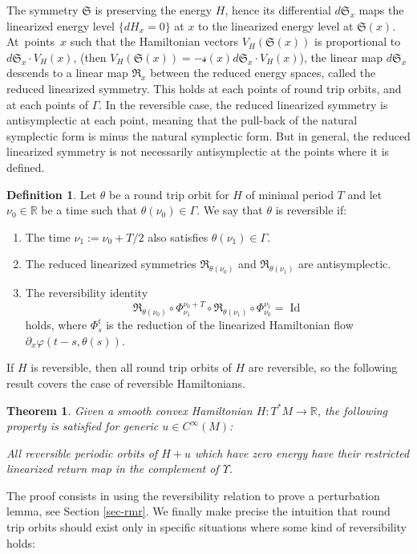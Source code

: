 \documentclass[10pt]{amsart}
\DeclareMathOperator{\Id}{Id}
\newcommand{\Rm}{\mathbb{R}}
\newcommand{\gR}{\ensuremath{\mathfrak{R}}}
\newcommand{\gS}{\ensuremath{\mathfrak{S}}}
\newcommand{\ms}{\ensuremath{\mathscr{s}}}
\theoremstyle{plain}
\newtheorem{thm}{Theorem}
\theoremstyle{definition}
\newtheorem{defn}[lem]{Definition}
\begin{document}
The symmetry $\gS$ is preserving the energy $H$, hence its differential $d\gS_x$ maps the linearized energy level $\{dH_x=0\}$ at $x$ to the linearized energy level at $\gS(x)$.
At~points~$x$ such that the Hamiltonian vectors $V_H(\gS(x))$ is proportional to \hbox{$d\gS_x \!\cdot\! V_H(x)$},
(then $
V_H(\gS(x))=-\ms(x) d\gS_x\cdot V_H(x)$),
the linear map $d\gS_x$ descends to a linear map $\gR_x$ between the reduced energy spaces,
called the reduced linearized symmetry.
This holds at each points of round trip orbits, and at each points of $\Gamma$.
In the reversible case, the reduced linearized symmetry is antisymplectic at each point,
meaning that the pull-back of the natural symplectic form is minus the natural symplectic form.
But in general, the reduced linearized symmetry is not necessarily antisymplectic at the points where it is defined.

\begin{defn}
Let $\theta$ be a round trip orbit for $H$ of minimal period $T$ and let $\nu_0\in \Rm$ be a time such that $\theta(\nu_0) \in \Gamma$. We say that $\theta$ is reversible if:
\begin{enumerate}
\item
The time $\nu_1:=\nu_0+T/2$ also satisfies $\theta(\nu_1)\in \Gamma$.
\item The reduced linearized symmetries $\gR_{\theta(\nu_0)}$ and $\gR_{\theta(\nu_1)}$ are antisymplectic.
\item The reversibility identity
\[
\gR_{\theta(\nu_0)}\circ \Phi^{\nu_0+T}_{\nu_1}\circ \gR_{\theta(\nu_1)}\circ\Phi_{\nu_0}^{\nu_1}=\Id
\]
holds, where $\Phi^t_s$ is the reduction of the linearized Hamiltonian flow
$\partial_x \varphi(t-s,\theta(s))$.
\end{enumerate}
\end{defn}

If $H$ is reversible, then all round trip orbits of $H$ are reversible, so the following result covers the case of reversible Hamiltonians.

\begin{thm}\label{thm-g4}
Given a smooth convex Hamiltonian $H: T^*M\rightarrow \Rm$,
the following property is satisfied for generic $u\in C^{\infty}(M)$:

All \emph{reversible} periodic
orbits of $H+u$ which have zero energy have their restricted linearized
return map in the complement of $\Upsilon$.
\end{thm}

The proof consists in using the reversibility relation to prove a perturbation lemma, see Section \ref{sec-rmr}.
We finally make precise the intuition that round trip orbits should exist only in specific situations where some kind of reversibility holds:
\end{document}
